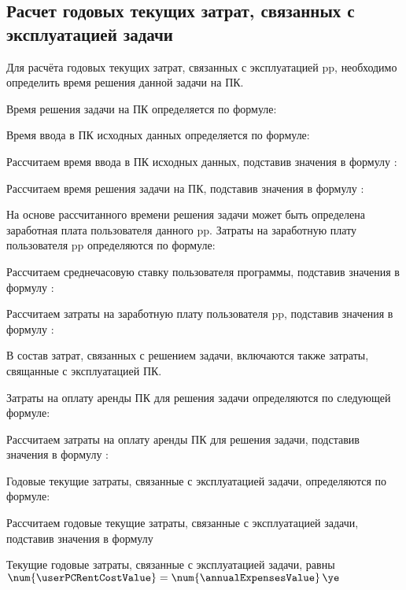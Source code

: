 \subsection{Расчет годовых текущих затрат, связанных с эксплуатацией задачи}
\label{sec:economics:manualTotalExpenses}

Для расчёта годовых текущих затрат, связанных с эксплуатацией \gls{pp}, необходимо определить время решения данной задачи на ПК.

Время решения задачи на ПК определяется по формуле:
\pcTaskAccomplishTimeCostEquation

Время ввода в ПК исходных данных определяется по формуле:
\manualInputTimeEquation

Рассчитаем время ввода в ПК исходных данных, подставив значения в формулу :
\manualInputTimeFormulaApplied

Рассчитаем время решения задачи на ПК, подставив значения в формулу :
\pcTaskAccomplishTimeCostFormulaApplied

На основе рассчитанного времени решения задачи может быть определена заработная плата пользователя данного \gls{pp}. Затраты на заработную плату пользователя \gls{pp} определяются по формуле:
\userSalaryEquation

Рассчитаем среднечасовую ставку пользователя программы, подставив значения в формулу :
\userRateFormulaApplied

Рассчитаем затраты на заработную плату пользователя \gls{pp}, подставив значения в формулу :
\userSalaryFormulaApplied

В состав затрат, связанных с решением задачи, включаются также затраты, свящанные с эксплуатацией ПК.

Затраты на оплату аренды ПК для решения задачи определяются по следующей формуле:
\userPCRentCostEquation

Рассчитаем затраты на оплату аренды ПК для решения задачи, подставив значения в формулу :
\userPCRentCostFormulaApplied

Годовые текущие затраты, связанные с эксплуатацией задачи, определяются по формуле:
\annualExpensesEquation

Рассчитаем годовые текущие затраты, связанные с эксплуатацией задачи, подставив значения в формулу 
\annualExpensesFormulaApplied

Текущие годовые затраты, связанные с эксплуатацией задачи, равны \(\num{\userPCRentCostValue} = \num{\annualExpensesValue} \, \ye\)